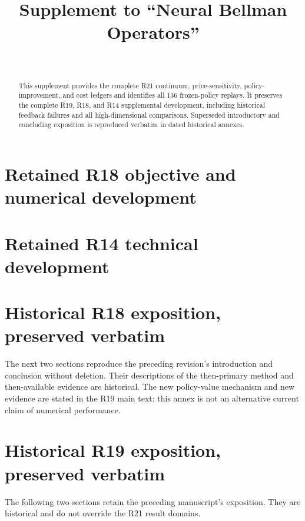 \documentclass[ecta]{econsocart}
\theoremstyle{remark}
\begin{document}
\begin{frontmatter}
\title{Supplement to ``Neural Bellman Operators''}
\begin{aug}
\author[id=au1,addressref={add1}]{~}
\address[id=add1]{}
\end{aug}
\begin{abstract}
This supplement provides the complete R21 continuum, price-sensitivity, policy-improvement, and cost ledgers and identifies all 136 frozen-policy replays. It preserves the complete R19, R18, and R14 supplemental development, including historical feedback failures and all high-dimensional comparisons. Superseded introductory and concluding exposition is reproduced verbatim in dated historical annexes.
\end{abstract}
\end{frontmatter}


\section{Retained R18 objective and numerical development}


\section{Retained R14 technical development}

\clearpage
\section{Historical R18 exposition, preserved verbatim}
The next two sections reproduce the preceding revision's introduction and conclusion without deletion. Their descriptions of the then-primary method and then-available evidence are historical. The new policy-value mechanism and new evidence are stated in the R19 main text; this annex is not an alternative current claim of numerical performance.


\clearpage
\section{Historical R19 exposition, preserved verbatim}
The following two sections retain the preceding manuscript's exposition. They are historical and do not override the R21 result domains.


\clearpage

\end{document}
